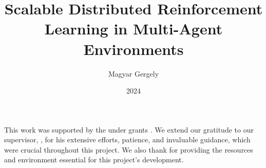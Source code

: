 \documentclass[
]{classes/TDK_en}[2023/04/10]
\title{Scalable Distributed Reinforcement Learning in Multi-Agent Environments}
\date{2024}
\author{Magyar Gergely}
\affiliation{Associate Professor}
\begin{document}


\makecover
\cleardoublepage
\maketitle

\hypersetup{linkcolor=black}
\tableofcontents
\hypersetup{linkcolor=deepblue}
\cleardoublepage


\cleardoublepage


\cleardoublepage


\cleardoublepage


\cleardoublepage


\cleardoublepage


\cleardoublepage

\chapter*{\acklabel}

\noindent This work was supported by the  under grants . We extend our gratitude to our supervisor, , for his extensive efforts, patience, and invaluable guidance, which were crucial throughout this project. We also thank  for providing the resources and environment essential for this project's development.

\appendix



\cleardoublepage

{}
\printbibliography[title=\biblabel]
\cleardoublepage

{}
\listoffigures
\cleardoublepage

{}
\listoftables
\cleardoublepage

{}
\listofalgorithms
\cleardoublepage


\printnomenclature

\cleardoublepage

\end{document}
